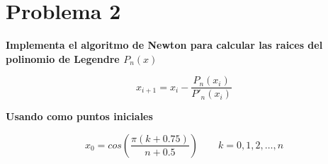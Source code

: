 \section*{Problema 2}

\textbf{Implementa el algoritmo de Newton para calcular las raices del polinomio de Legendre $P_n(x)$}

\begin{equation*}
    x_{i+1} = x_i - \frac{P_n(x_i)}{P'_n(x_i)}
\end{equation*}

\textbf{Usando como puntos iniciales}

\begin{equation*}
    x_0 = cos \left (\frac{\pi(k+0.75)}{n+0.5}\right ) \qquad k=0,1,2,\dots,n
\end{equation*}